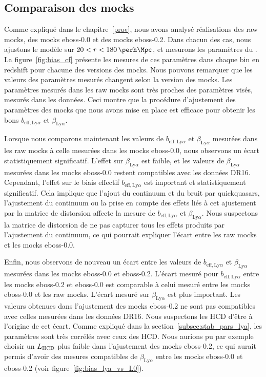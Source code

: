 \documentclass[11pt, twoside, a4paper, openright]{report}
\begin{document}
\subsection{Comparaison des mocks}
Comme expliqué dans le chapitre~\ref{prov}, nous avons analysé \Nmocks réalisations des raw mocks, des mocks eboss-0.0 et des mocks eboss-0.2.
Dans chacun des cas, nous ajustons le modèle sur $20 < r < \SI{180}{\perh\Mpc}$, et mesurons les paramètres du \lya{}.
La figure~\ref{fig:bias_cf} présente les mesures de ces paramètres dans chaque bin en redshift pour chacune des versions des mocks.
Nous pouvons remarquer que les valeurs des paramètres \lya{} mesurés changent selon la version des mocks.
Les paramètres mesurés dans les raw mocks sont très proches des paramètres visés, mesurés dans les données. Ceci montre que la procédure d'ajustement des paramètres des mocks que nous avons mise en place est efficace pour obtenir les bons $b_{\mathrm{eff},\mathrm{Ly}\alpha}$ et $\beta_{\mathrm{Ly}\alpha}$.

Lorsque nous comparons maintenant les valeurs de $b_{\mathrm{eff},\mathrm{Ly}\alpha}$ et $\beta_{\mathrm{Ly}\alpha}$ mesurées dans les raw mocks à celle mesurées dans les mocks eboss-0.0, nous observons un écart statistiquement significatif. L'effet sur $\beta_{\mathrm{Ly}\alpha}$ est faible, et les valeurs de $\beta_{\mathrm{Ly}\alpha}$ mesurées dans les mocks eboss-0.0 restent compatibles avec les données DR16.
Cependant, l'effet sur le biais effectif $b_{\mathrm{eff},\mathrm{Ly}\alpha}$ est important et statistiquement significatif. Cela implique que l'ajout du continuum et du bruit par quickquasars, l'ajustement du continuum ou la prise en compte des effets liés à cet ajustement par la matrice de distorsion affecte la mesure de $b_{\mathrm{eff},\mathrm{Ly}\alpha}$ et $\beta_{\mathrm{Ly}\alpha}$. Nous suspectons la matrice de distorsion de ne pas capturer tous les effets produits par l'ajustement du continuum, ce qui pourrait expliquer l'écart entre les raw mocks et les mocks eboss-0.0.

Enfin, nous observons de nouveau un écart entre les valeurs de $b_{\mathrm{eff},\mathrm{Ly}\alpha}$ et $\beta_{\mathrm{Ly}\alpha}$ mesurées dans les mocks eboss-0.0 et eboss-0.2. L'écart mesuré pour $b_{\mathrm{eff},\mathrm{Ly}\alpha}$ entre les mocks eboss-0.2 et eboss-0.0 est comparable à celui mesuré entre les mocks eboss-0.0 et les raw mocks.
L'écart mesuré sur $\beta_{\mathrm{Ly}\alpha}$ est plus important. Les valeurs obtenues dans l'ajustement des mocks eboss-0.2 ne sont pas compatibles avec celles mesurées dans les données DR16. Nous suspectons les HCD d'être à l'origine de cet écart. Comme expliqué dans la section~\ref{subsec:stab_pars_lya}, les paramètres \lya{} sont très corrélés avec ceux des HCD. Nous aurions pu par exemple choisir un $L_{\textsc{HCD}}$ plus faible dans l'ajustement des mocks eboss-0.2, ce qui aurait permis d'avoir des mesures compatibles de $\beta_{\mathrm{Ly}\alpha}$ entre les mocks eboss-0.0 et eboss-0.2 (voir figure~\ref{fig:bias_lya_vs_L0}).
\end{document}
